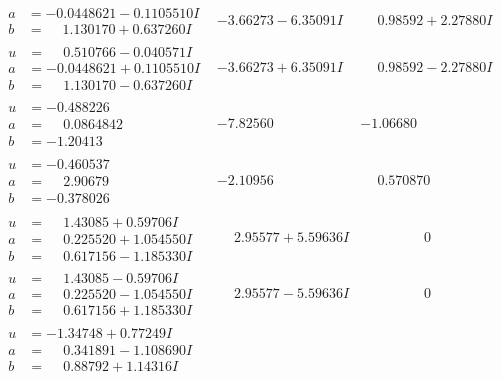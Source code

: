 \documentclass[1p]{elsarticle_modified}
\theoremstyle{definition}
\begin{document}
$$\begin{array}{c|c|c}
\begin{aligned}
a &= -0.0448621 - 0.1105510 I \\
b &= \phantom{-}1.130170 + 0.637260 I\end{aligned}
 & -3.66273 - 6.35091 I & \phantom{-}0.98592 + 2.27880 I \\ \hline\begin{aligned}
u &= \phantom{-}0.510766 - 0.040571 I \\
a &= -0.0448621 + 0.1105510 I \\
b &= \phantom{-}1.130170 - 0.637260 I\end{aligned}
 & -3.66273 + 6.35091 I & \phantom{-}0.98592 - 2.27880 I \\ \hline\begin{aligned}
u &= -0.488226\phantom{ +0.000000I} \\
a &= \phantom{-}0.0864842\phantom{ +0.000000I} \\
b &= -1.20413\phantom{ +0.000000I}\end{aligned}
 & -7.82560\phantom{ +0.000000I} & -1.06680\phantom{ +0.000000I} \\ \hline\begin{aligned}
u &= -0.460537\phantom{ +0.000000I} \\
a &= \phantom{-}2.90679\phantom{ +0.000000I} \\
b &= -0.378026\phantom{ +0.000000I}\end{aligned}
 & -2.10956\phantom{ +0.000000I} & \phantom{-}0.570870\phantom{ +0.000000I} \\ \hline\begin{aligned}
u &= \phantom{-}1.43085 + 0.59706 I \\
a &= \phantom{-}0.225520 + 1.054550 I \\
b &= \phantom{-}0.617156 - 1.185330 I\end{aligned}
 & \phantom{-}2.95577 + 5.59636 I & \phantom{-0.000000 } 0 \\ \hline\begin{aligned}
u &= \phantom{-}1.43085 - 0.59706 I \\
a &= \phantom{-}0.225520 - 1.054550 I \\
b &= \phantom{-}0.617156 + 1.185330 I\end{aligned}
 & \phantom{-}2.95577 - 5.59636 I & \phantom{-0.000000 } 0 \\ \hline\begin{aligned}
u &= -1.34748 + 0.77249 I \\
a &= \phantom{-}0.341891 - 1.108690 I \\
b &= \phantom{-}0.88792 + 1.14316 I\end{aligned}

\end{array}$$
\end{document}
